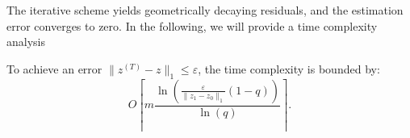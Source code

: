 \documentclass[sigconf,review, nonacm]{acmart}
\newcommand\s{\boldsymbol{\mathit{s}}}
\newcommand\zz{\boldsymbol{\mathit{z}}}
\renewcommand\AA{\boldsymbol{\mathit{A}}}
\newcommand\DD{\boldsymbol{\mathit{D}}}
\newcommand\II{\boldsymbol{\mathit{I}}}
\newcommand\LL{\boldsymbol{\mathit{L}}}
\begin{document}





The iterative scheme yields geometrically decaying residuals, and the estimation error converges to zero. In the following, we will provide a
time complexity analysis



\begin{theorem}\label{thm:time_complexity}To achieve an error $\| z^{(T)}-z\|_1\le \varepsilon$, the time complexity is bounded by:\[O\!\left\lceil m \frac{\ln(\frac{\varepsilon}{\|z_1-z_0\|_1}(1-q))}{\ln(q)} \right\rceil.\]
\end{theorem}
\end{document}
